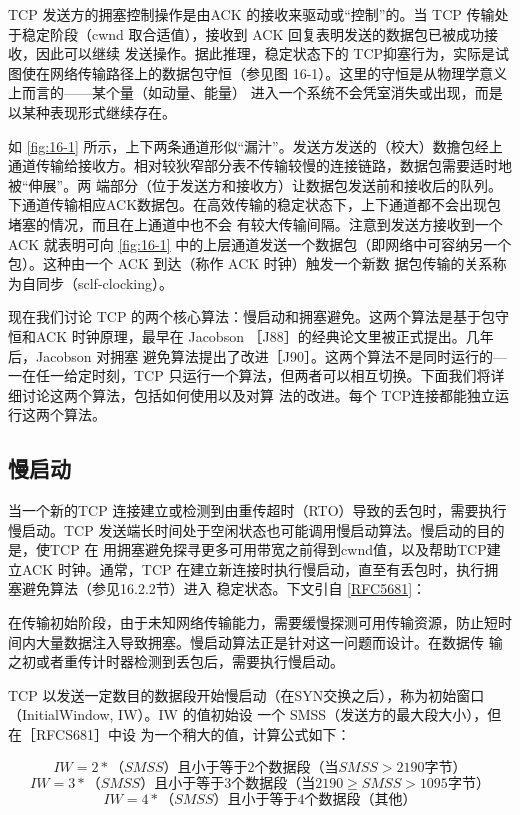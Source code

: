 TCP 发送方的拥塞控制操作是由ACK 的接收来驱动或“控制”的。当 TCP 传输处于稳定阶段（cwnd 取合适值），接收到 ACK 回复表明发送的数据包已被成功接收，因此可以继续
发送操作。据此推理，稳定状态下的 TCP抑塞行为，实际是试图使在网络传输路径上的数据包守恒（参见图 16-1）。这里的守恒是从物理学意义上而言的——某个量（如动量、能量）
进入一个系统不会凭室消失或出现，而是以某种表现形式继续存在。

如 \ref{fig:16-1} 所示，上下两条通道形似“漏汁”。发送方发送的（校大）数擔包经上通道传输给接收方。相对较狄窄部分表不传输较慢的连接链路，数据包需要适时地被“伸展”。两
端部分（位于发送方和接收方）让数据包发送前和接收后的队列。下通道传输相应ACK数据包。在高效传输的稳定状态下，上下通道都不会出现包堵塞的情况，而且在上通道中也不会
有较大传输间隔。注意到发送方接收到一个 ACK 就表明可向 \ref{fig:16-1} 中的上层通道发送一个数据包（即网络中可容纳另一个包）。这种由一个 ACK 到达（称作 ACK 时钟）触发一个新数
据包传输的关系称为自同步（sclf-clocking）。

现在我们讨论 TCP 的两个核心算法：慢启动和拥塞避免。这两个算法是基于包守恒和ACK 时钟原理，最早在 Jacobson ［J88］的经典论文里被正式提出。几年后，Jacobson 对拥塞
避免算法提出了改进［J90］。这两个算法不是同时运行的—一在任一给定时刻，TCP 只运行一个算法，但两者可以相互切换。下面我们将详细讨论这两个算法，包括如何使用以及对算
法的改进。每个 TCP连接都能独立运行这两个算法。

\subsection{慢启动}
当一个新的TCP 连接建立或检测到由重传超时（RTO）导致的丢包时，需要执行慢启动。TCP 发送端长时间处于空闲状态也可能调用慢启动算法。慢启动的目的是，使TCP 在
用拥塞避免探寻更多可用带宽之前得到cwnd值，以及帮助TCP建立ACK 时钟。通常，TCP 在建立新连接时执行慢启动，直至有丢包时，执行拥塞避免算法（参见16.2.2节）进入
稳定状态。下文引自 \href{https://www.rfc-editor.org/rfc/rfc5681}{[RFC5681]}：

\begin{tcolorbox}
    在传输初始阶段，由于未知网络传输能力，需要缓慢探测可用传输资源，防止短时间内大量数据注入导致拥塞。慢启动算法正是针对这一问题而设计。在数据传
    输之初或者重传计时器检测到丢包后，需要执行慢启动。
\end{tcolorbox}

TCP 以发送一定数目的数据段开始慢启动（在SYN交换之后），称为初始窗口（InitialWindow, IW）。IW 的值初始设 一个 SMSS（发送方的最大段大小），但在［RFCS681］中设
为一个稍大的值，计算公式如下：

\begin{equation}
    IW =2* （SMSS）且小于等于2个数据段（当SMSS>2190字节）
\end{equation}
\begin{equation}
    IW =3* （SMSS）且小于等于3个数据段（当2190≥SMSS>1095字节）
\end{equation}
\begin{equation}
    IW =4*（SMSS）且小于等于4个数据段（其他）
\end{equation}

